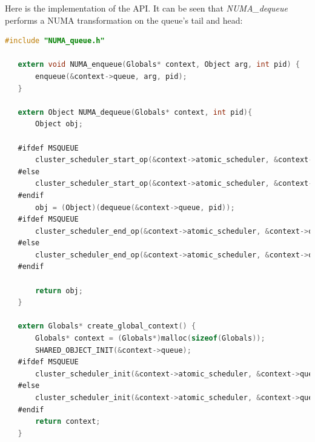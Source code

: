 \documentclass{article}
\begin{document}
 Here is the implementation of the API. It can be seen that \textit{NUMA\_dequeue} performs a NUMA transformation on the queue's tail and head:

 \begin{lstlisting}[language=C]
   #include "NUMA_queue.h"
   
   extern void NUMA_enqueue(Globals* context, Object arg, int pid) {
       enqueue(&context->queue, arg, pid);
   }
   
   extern Object NUMA_dequeue(Globals* context, int pid){
       Object obj;
   
   #ifdef MSQUEUE
       cluster_scheduler_start_op(&context->atomic_scheduler, &context->queue.Head);
   #else
       cluster_scheduler_start_op(&context->atomic_scheduler, &context->queue.Head->head);
   #endif
       obj = (Object)(dequeue(&context->queue, pid));
   #ifdef MSQUEUE
       cluster_scheduler_end_op(&context->atomic_scheduler, &context->queue.Tail);
   #else
       cluster_scheduler_end_op(&context->atomic_scheduler, &context->queue.Tail->tail);
   #endif
       
       return obj;
   }
   
   extern Globals* create_global_context() {
       Globals* context = (Globals*)malloc(sizeof(Globals));
       SHARED_OBJECT_INIT(&context->queue);
   #ifdef MSQUEUE
       cluster_scheduler_init(&context->atomic_scheduler, &context->queue.Head, &context->queue.Tail);
   #else
       cluster_scheduler_init(&context->atomic_scheduler, &context->queue.Head->head, &context->queue.Tail->tail);
   #endif
       return context;
   }
 \end{lstlisting}
\end{document}
